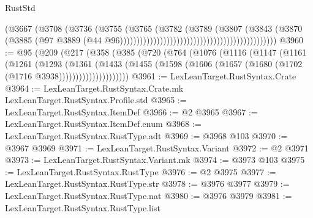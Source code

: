 \begin{lexlean}{RustStd}
\begin{coremodule}
                                                                        (@3667
                                                                          (@3708
                                                                            (@3736
                                                                              (@3755
                                                                                (@3765
                                                                                  (@3782
                                                                                    (@3789
                                                                                      (@3807
                                                                                        (@3843
                                                                                          (@3870
                                                                                            (@3885
                                                                                              (@97
                                                                                                @3889
                                                                                                (@44
                                                                                                  @96)))))))))))))))))))))))))))))))))))))))))))))))
@3960 := @95
    (@209
      (@217
        (@358
          (@385
            (@720
              (@764
                (@1076
                  (@1116
                    (@1147
                      (@1161
                        (@1261
                          (@1293
                            (@1361
                              (@1433
                                (@1455
                                  (@1598
                                    (@1606 (@1657 (@1680 (@1702 (@1716 @3938)))))))))))))))))))))
@3961 := LexLeanTarget.RustSyntax.Crate
@3964 := LexLeanTarget.RustSyntax.Crate.mk LexLeanTarget.RustSyntax.Profile.std
@3965 := LexLeanTarget.RustSyntax.ItemDef
@3966 := @2 @3965
@3967 := LexLeanTarget.RustSyntax.ItemDef.enum
@3968 := LexLeanTarget.RustSyntax.RustType.adt
@3969 := @3968 @103
@3970 := @3967 @3969
@3971 := LexLeanTarget.RustSyntax.Variant
@3972 := @2 @3971
@3973 := LexLeanTarget.RustSyntax.Variant.mk
@3974 := @3973 @103
@3975 := LexLeanTarget.RustSyntax.RustType
@3976 := @2 @3975
@3977 := LexLeanTarget.RustSyntax.RustType.str
@3978 := @3976 @3977
@3979 := LexLeanTarget.RustSyntax.RustType.nat
@3980 := @3976 @3979
@3981 := LexLeanTarget.RustSyntax.RustType.list

\end{coremodule}
\end{lexlean}
